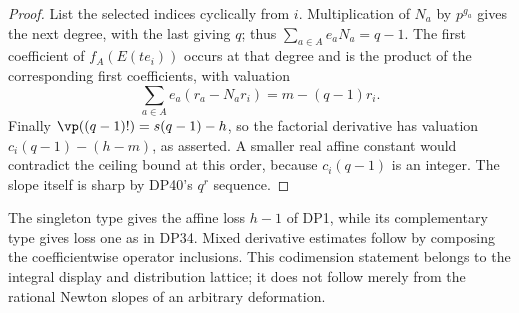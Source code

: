 \begin{proof}
List the selected indices cyclically from $i$. Multiplication of $N_a$ by $p^{g_a}$ gives the next degree, with the last giving $q$; thus
$\sum_{a\in A}e_aN_a=q-1$.
The first coefficient of $f_A(E(te_i))$ occurs at that degree and is the product of the corresponding first coefficients, with valuation
\[
 \sum_{a\in A}e_a(r_a-N_ar_i)=m-(q-1)r_i.
\]
Finally $\vp((q-1)!)=s(q-1)-h$, so the factorial derivative has valuation
$c_i(q-1)-(h-m)$, as asserted.
A smaller real affine constant would contradict the ceiling bound at this order, because $c_i(q-1)$ is an integer. The slope itself is sharp by DP40's $q^r$ sequence.
\end{proof}

The singleton type gives the affine loss $h-1$ of DP1, while its complementary type gives loss one as in DP34. Mixed derivative estimates follow by composing the coefficientwise operator inclusions. This codimension statement belongs to the integral display and distribution lattice; it does not follow merely from the rational Newton slopes of an arbitrary deformation.

